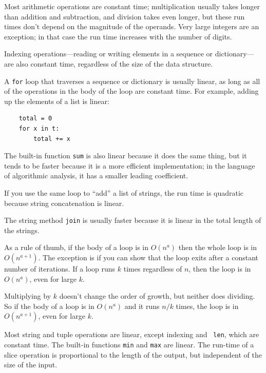 \documentclass[10pt]{book}
\begin{document}
Most arithmetic operations are constant time; multiplication
usually takes longer than addition and subtraction, and division
takes even longer, but these run times don't
depend on the magnitude of the operands.  Very large integers
are an exception; in that case the run time increases
with the number of digits.

Indexing operations---reading or writing elements in a sequence
or dictionary---are also constant time, regardless of the size
of the data structure.

A {\tt for} loop that traverses a sequence or dictionary is
usually linear, as long as all of the operations in the body
of the loop are constant time.  For example, adding up the
elements of a list is linear:

\begin{verbatim}
    total = 0
    for x in t:
        total += x
\end{verbatim}

The built-in function {\tt sum} is also linear because it does
the same thing, but it tends to be faster because it is a more
efficient implementation; in the language of algorithmic analysis,
it has a smaller leading coefficient.

If you use the same loop to ``add'' a list of strings, the
run time is quadratic
because string concatenation is linear.

The string method {\tt join} is usually faster because it is
linear in the total length of the strings.

As a rule of thumb, if the body of a loop is in $O(n^a)$ then
the whole loop is in $O(n^{a+1})$.  The exception is if you can
show that the loop exits after a constant number of iterations.
If a loop runs $k$ times regardless of $n$, then
the loop is in $O(n^a)$, even for large $k$.

Multiplying by $k$ doesn't change the order of growth, but neither
does dividing.  So if the body of a loop is in $O(n^a)$ and it runs
$n/k$ times, the loop is in $O(n^{a+1})$, even for large $k$.

Most string and tuple operations are linear, except indexing and {\tt
  len}, which are constant time.  The built-in functions {\tt min} and
{\tt max} are linear.  The run-time of a slice operation is
proportional to the length of the output, but independent of the size
of the input.
\end{document}
